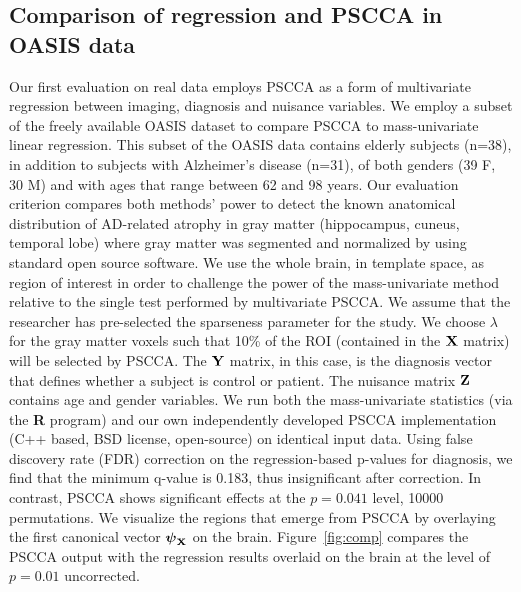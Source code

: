 \documentclass{llncs}
\newcommand{\X}{{\bf X}}
\newcommand{\Y}{{\bf Y}}
\newcommand{\Z}{{\bf Z}}
\newcommand{\bs}{\boldsymbol}
\begin{document}
\subsection{Comparison of regression and PSCCA in OASIS data}  
Our first evaluation on real data employs PSCCA as a form of
multivariate regression between imaging, diagnosis and nuisance variables.  
We employ a subset of the freely available OASIS dataset to compare
PSCCA to mass-univariate linear regression.  This subset of the OASIS
data contains elderly subjects (n=38), in addition to subjects with
Alzheimer's disease (n=31), of both genders (39 F, 30 M) and with ages
that range between 62 and 98 years.  Our evaluation criterion compares
both methods' power to detect the known anatomical distribution of
AD-related atrophy in gray matter (hippocampus, cuneus, temporal lobe)
\cite{Avants2010b} where gray matter was segmented and normalized by using standard
open source software.  We use the whole brain, in template space, as region of interest in order to
challenge the power of the mass-univariate method relative to the
single test performed by multivariate PSCCA.  We assume that the
researcher has pre-selected the sparseness parameter for the study.
We choose $\lambda$ for the gray matter voxels such that 10\% of the
ROI (contained in the $\X$ matrix) will be selected by PSCCA.  The
$\Y$ matrix, in this case, is the diagnosis vector that defines
whether a subject is control or patient.  The nuisance matrix $\Z$
contains age and gender variables.  We run both the mass-univariate
statistics (via the {\bf R} program) and our own independently
developed PSCCA implementation (C++ based, BSD license, open-source)
on identical input data.  Using false discovery rate (FDR) correction
on the regression-based p-values for diagnosis, we find that the
minimum q-value is 0.183, thus insignificant after correction.  In
contrast, PSCCA shows significant effects at the $p=0.041$ level,
10000 permutations.  We visualize the regions that emerge from PSCCA
by overlaying the first canonical vector $\bs \psi_{\X}$ on the brain.
Figure~\ref{fig:comp} compares the PSCCA output with the regression
results overlaid on the brain at the level of $p=0.01$ uncorrected.
\end{document}
